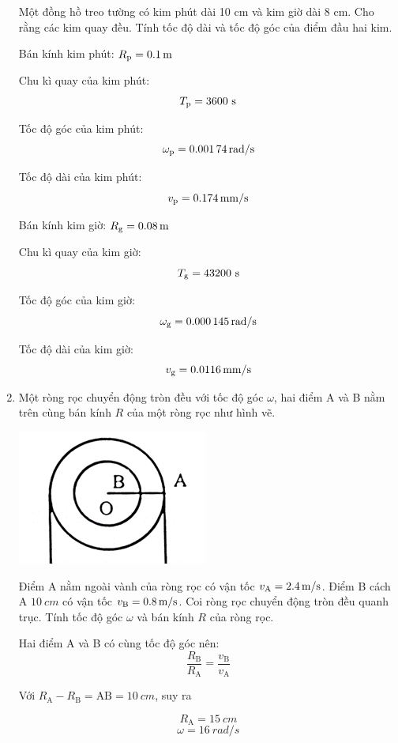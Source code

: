 \begin{enumerate}[label=\bfseries Câu \arabic*:]
	\cauhoi
	{Một đồng hồ treo tường có kim phút dài 10 cm và kim giờ dài 8 cm. Cho rằng các kim quay đều. Tính tốc độ dài và tốc độ góc của điểm đầu hai kim.
	}
	\loigiai
	{Bán kính kim phút: $R_\text p = \SI{0.1}{m}$
		
		Chu kì quay của kim phút: $$T_\text p = 3600\ \text s$$
		
		Tốc độ góc của kim phút:
		$$\omega_\text p = \SI{0.00174}{rad/s}$$
		
		Tốc độ dài của kim phút:
		$$v_\text p = \SI{0.174}{mm/s}$$
		
	Bán kính kim giờ: $R_\text g = \SI{0.08}{m}$
	
	Chu kì quay của kim giờ: $$T_\text g = 43200\ \text s$$
	
	Tốc độ góc của kim giờ:
	$$\omega_\text g = \SI{0.000145}{rad/s}$$
	
	Tốc độ dài của kim giờ:
	$$v_\text g = \SI{0.0116}{mm/s}$$	
	}
	\item {}
	
	\cauhoi
	{Một ròng rọc chuyển động tròn đều với tốc độ góc $\omega$, hai điểm A và B nằm trên cùng bán kính $R$ của một ròng rọc như hình vẽ.
		
		\begin{center}
			\includegraphics[scale=0.7]{../figs/VN10-2021-PH-TP006-1.png}
		\end{center}
		 Điểm A nằm ngoài vành của ròng rọc có vận tốc $v_\text A = \SI{2.4}{m/s}$. Điểm B cách A $\SI{10}{cm}$ có vận tốc $v_\text B = \SI{0.8}{m/s}$. Coi ròng rọc chuyển động tròn đều quanh trục. Tính tốc độ góc $\omega$ và bán kính $R$ của ròng rọc.
	}
	\loigiai
	{Hai điểm A và B có cùng tốc độ góc nên:
		$$\dfrac{R_\text{B}}{R_\text{A}} = \dfrac{v_\text{B}}{v_\text{A}}$$
		
		Với $R_\text{A} - R_\text{B} = \text{AB} = \SI{10}{cm}$, suy ra
		
		$$R_\text{A} =\SI{15}{cm}$$
		$$\omega=\SI{16}{rad/s}$$
	}
\end{enumerate}